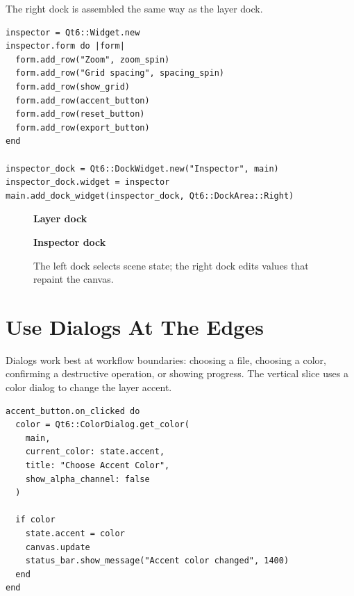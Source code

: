The right dock is assembled the same way as the layer dock.

\begin{lstlisting}[style=crystal]
inspector = Qt6::Widget.new
inspector.form do |form|
  form.add_row("Zoom", zoom_spin)
  form.add_row("Grid spacing", spacing_spin)
  form.add_row(show_grid)
  form.add_row(accent_button)
  form.add_row(reset_button)
  form.add_row(export_button)
end

inspector_dock = Qt6::DockWidget.new("Inspector", main)
inspector_dock.widget = inspector
main.add_dock_widget(inspector_dock, Qt6::DockArea::Right)
\end{lstlisting}

\begin{figure}[tbp]
  \centering
  \begin{minipage}{0.46\textwidth}
    \centering
    \textbf{Layer dock}\par\smallskip
  \end{minipage}\hfill
  \begin{minipage}{0.48\textwidth}
    \centering
    \textbf{Inspector dock}\par\smallskip
  \end{minipage}
  \caption{The left dock selects scene state; the right dock edits values that repaint the canvas.}
\end{figure}

\section{Use Dialogs At The Edges}

Dialogs work best at workflow boundaries: choosing a file, choosing a color, confirming a destructive operation, or showing progress. The vertical slice uses a color dialog to change the layer accent.

\begin{lstlisting}[style=crystal]
accent_button.on_clicked do
  color = Qt6::ColorDialog.get_color(
    main,
    current_color: state.accent,
    title: "Choose Accent Color",
    show_alpha_channel: false
  )

  if color
    state.accent = color
    canvas.update
    status_bar.show_message("Accent color changed", 1400)
  end
end
\end{lstlisting}

